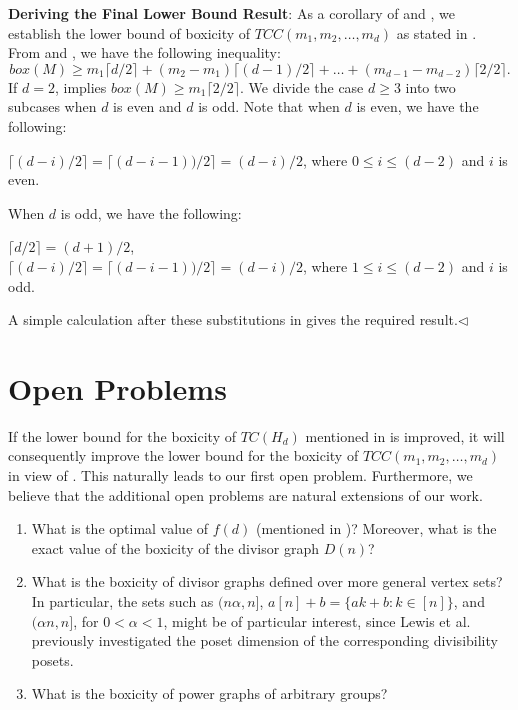\documentclass[twoside, 11pt]{article}
\newcommand{\M}{TCC(m_1,m_2,\dots,m_d)}
\newcommand{\ceil}[1]{\lceil #1 \rceil}
\begin{document}
\vspace{0.2cm}

\noindent \textbf{Deriving the Final Lower Bound Result}: As a corollary of  and , we establish the lower bound of boxicity of $\M$ as stated in .
From  and , we have the following inequality:
\begin{equation}\label{eq3}
   box(M) \geq m_1 \ceil{d/2} + (m_2-m_1) \ceil{(d-1)/2} + \dots + (m_{d-1}-m_{d-2}) \ceil{2/2}. 
\end{equation}
If $d=2$,  implies $box(M) \geq m_1 \ceil{2/2}$. We divide the case $d\geq 3$ into two subcases when $d$ is even and $d$ is odd. Note that when $d$ is even, we have the following:
\begin{center}
    $\ceil{(d-i)/2}=\ceil{(d-i-1))/2}=(d-i)/2$, where $0\leq i \leq (d-2)$ and $i$ is even.
\end{center}
When $d$ is odd, we have the following:
\begin{center}
   $\ceil{d/2} = (d+1)/2$, \\ $\ceil{(d-i)/2}=\ceil{(d-i-1))/2}=(d-i)/2$, where $1 \leq i \leq (d-2)$ and $i$ is odd.
\end{center}

A simple calculation after these substitutions  in  gives the required result.\hfill $\lhd$


\section{Open Problems}

If the lower bound for the boxicity of $TC(H_d)$ mentioned in  is improved, it will consequently improve the lower bound for the boxicity of $\M$ in view of . This naturally leads to our first open problem. Furthermore,  we believe that the additional open problems are natural extensions of our work.
\begin{enumerate}
    \item What is the optimal value of $f(d)$ (mentioned in )? Moreover, what is the exact value of the boxicity of the divisor graph $D(n)$?
    
    \item What is the boxicity of divisor graphs defined over more general vertex sets? In particular, the sets such as \( (n\alpha, n] \), \( a[n] + b = \{ak + b : k \in [n]\} \), and \( (\alpha n, n] \), for \( 0 < \alpha < 1 \), might be of particular interest, since Lewis et al. \cite{lewis2021order} previously investigated the poset dimension of the corresponding divisibility posets.
    
    \item What is the boxicity of power graphs of arbitrary groups?
\end{enumerate}





\end{document}
